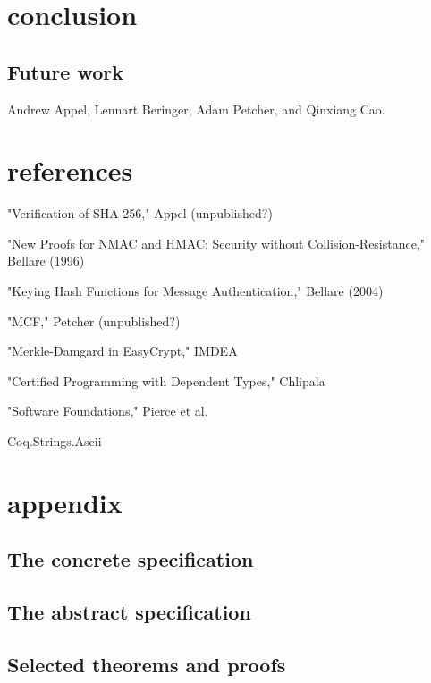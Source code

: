 \documentclass[twocolumn,showpacs,%
  nofootinbib,aps,superscriptaddress,%
  eqsecnum,prd,notitlepage,showkeys,10pt]{revtex4-1}
\begin{document}
\section{conclusion}

\subsection{Future work}



\begin{acknowledgments}

Andrew Appel, Lennart Beringer, Adam Petcher, and Qinxiang Cao.

\end{acknowledgments}

\section{references}

"Verification of SHA-256," Appel (unpublished?)

"New Proofs for NMAC and HMAC: Security without Collision-Resistance," Bellare (1996)

"Keying Hash Functions for Message Authentication," Bellare (2004)

"MCF," Petcher (unpublished?)

"Merkle-Damgard in EasyCrypt," IMDEA

"Certified Programming with Dependent Types," Chlipala

"Software Foundations," Pierce et al.

Coq.Strings.Ascii

\section{appendix}

\subsection{The concrete specification}

\subsection{The abstract specification}

\subsection{Selected theorems and proofs}
\end{document}
